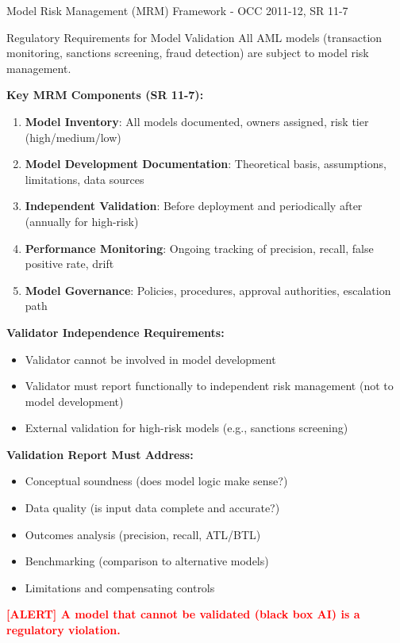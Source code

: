 \documentclass[11pt,a4paper]{beamer}
\newcommand{\redflag}[1]{\textcolor{red}{\textbf{[ALERT] #1}}}
\begin{document}
\begin{frame}{Model Risk Management (MRM) Framework - OCC 2011-12, SR 11-7}
	\begin{block}{Regulatory Requirements for Model Validation}
		All AML models (transaction monitoring, sanctions screening, fraud detection) are subject to model risk management.
	\end{block}
	\textbf{Key MRM Components (SR 11-7):}
	\begin{enumerate}
		\item \textbf{Model Inventory}: All models documented, owners assigned, risk tier (high/medium/low)
		\item \textbf{Model Development Documentation}: Theoretical basis, assumptions, limitations, data sources
		\item \textbf{Independent Validation}: Before deployment and periodically after (annually for high-risk)
		\item \textbf{Performance Monitoring}: Ongoing tracking of precision, recall, false positive rate, drift
		\item \textbf{Model Governance}: Policies, procedures, approval authorities, escalation path
	\end{enumerate}
	\textbf{Validator Independence Requirements:}
	\begin{itemize}
		\item Validator cannot be involved in model development
		\item Validator must report functionally to independent risk management (not to model development)
		\item External validation for high-risk models (e.g., sanctions screening)
	\end{itemize}
	\textbf{Validation Report Must Address:}
	\begin{itemize}
		\item Conceptual soundness (does model logic make sense?)
		\item Data quality (is input data complete and accurate?)
		\item Outcomes analysis (precision, recall, ATL/BTL)
		\item Benchmarking (comparison to alternative models)
		\item Limitations and compensating controls
	\end{itemize}
	\redflag{A model that cannot be validated (black box AI) is a regulatory violation.}
\end{frame}
\end{document}
